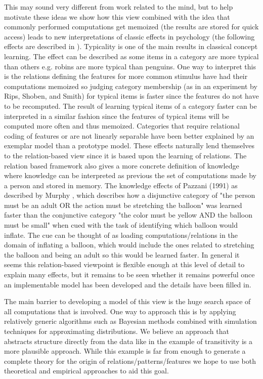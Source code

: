 \documentclass[doc]{apa}%
\begin{document}
This may sound very different from work related to the mind, but to
help motivate these ideas we show how this view combined with the idea
that commonly performed computations get memoized (the results are
stored for quick access) leads to new interpretations of classic
effects in psychology (the following effects are described in \cite{bbc}).  Typicality is one of the main results in
classical concept learning.  The effect can be described as some items
in a category are more typical than others e.g. robins are more
typical than penguins.  One way to interpret this is the relations
defining the features for more common stimulus have had their
computations memoized so judging category membership (as in an
experiment by Rips,
Shoben, and Smith) for typical items is faster since the features
do not have to be recomputed.  The result of learning typical items of
a category faster can be interpreted in a similar fashion since the
features of typical items will be computed more often and thus
memoized.  Categories that require relational coding of features or
are not linearly separable have been better explained by an exemplar
model than a prototype model. These effects naturally lend themselves to the relation-based view
since it is based upon the learning of relations.  The relation based
framework also gives a more concrete definition of
knowledge where knowledge can be interpreted as previous the set of
computations made by a person and stored in memory.  The knowledge
effects of Pazzani (1991) as described by Murphy \cite{bbc}, which
describes how a disjunctive category of "the person must be an adult
OR the action must be stretching the balloon" was learned faster than
the conjunctive category "the color must be yellow AND the balloon
must be small" when cued with the task of identifying which balloon
would inflate.  The cue can be thought of as loading
computations/relations in the domain of inflating a balloon, which
would include the ones related to stretching the balloon and being an
adult so this would be learned faster.  In general it seems this relation-based
viewpoint is flexible enough at this level of detail to explain many
effects, but it remains to be seen whether it remains powerful once an
implementable model has been developed and the details have been
filled in.

The main barrier to developing a model of this view is the huge search
space of all computations that is involved.  One way to approach this
is by applying relatively generic algorithms such as Bayesian methods
combined with simulation techniques for approximating distributions.
We believe an approach that abstracts structure directly from the data
like in the example of transitivity is a more plausible approach.
While this example is far from enough to generate a complete theory
for the origin of relations/patterns/features we hope to use both
theoretical and empirical approaches to aid this goal.
\end{document}
